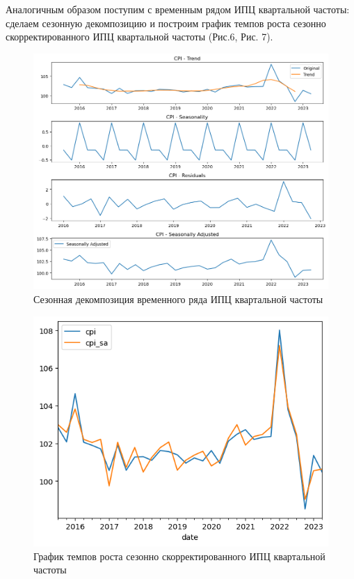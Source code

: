 \documentclass[a4paper, 12pt]{extarticle}
\begin{document}
	Аналогичным образом поступим с временным рядом ИПЦ квартальной частоты: сделаем сезонную декомпозицию и построим график темпов роста сезонно скорректированного ИПЦ квартальной частоты (Рис.6, Рис. 7).
	
	\begin{figure}[tph!]
		\centering
		\includegraphics[scale=0.6]{images/pic_06}
		\caption[Рис. 6]{Сезонная декомпозиция временного ряда ИПЦ квартальной частоты}
		\label{fig:pic06}
	\end{figure}
	
	\begin{figure}[bph!]
		\centering
		\includegraphics[scale=0.8]{images/pic_07}
		\caption[Рис. 7]{График темпов роста сезонно скорректированного ИПЦ квартальной частоты}
		\label{fig:pic07}
	\end{figure}
	
\end{document}
